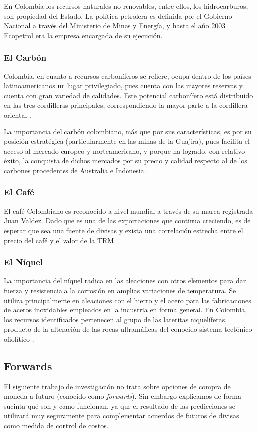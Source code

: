 \documentclass[letterpaper, spanish, 11pt]{report}
\begin{document}
En Colombia los recursos naturales no renovables, entre ellos, los hidrocarburos, son propiedad del Estado. La política petrolera es definida por el Gobierno Nacional a través del Ministerio de Minas y Energía, y hasta el año 2003 Ecopetrol era la empresa encargada de su ejecución.

\subsubsection{El Carbón}
Colombia, en cuanto a recursos carboníferos se refiere, ocupa dentro de los países latinoamericanos un lugar privilegiado, pues cuenta con las mayores reservas y cuenta con gran variedad de calidades. Este potencial carbonífero está distribuido en las tres cordilleras principales, correspondiendo la mayor parte a la cordillera oriental \cite{cardenas}.

La importancia del carbón colombiano, más que por sus características, es por su posición estratégica (particularmente en las minas de la Guajira), pues facilita el acceso al mercado europeo y norteamericano, y porque ha logrado, con relativo éxito, la conquista de dichos mercados por su precio y calidad respecto al de los carbones procedentes de Australia e Indonesia.

\subsubsection{El Café}
El café Colombiano es reconocido a nivel mundial a través de su marca registrada Juan Valdez. Dado que es una de las exportaciones que continua creciendo, es de esperar que sea una fuente de divisas y exista una correlación estrecha entre el precio del café y el valor de la TRM.

\subsubsection{El Níquel}
La importancia del níquel radica en las aleaciones con otros elementos para dar fuerza y resistencia a la corrosión en amplias variaciones de temperatura. Se utiliza principalmente en aleaciones con el hierro y el acero para las fabricaciones de aceros inoxidables empleados en la industria en forma general. En Colombia, los recursos identificados pertenecen al grupo de las lateritas niquelíferas, producto de la alteración de las rocas ultramáficas del conocido sistema tectónico ofiolítico \cite{cardenas}.

\subsection{Forwards}
El siguiente trabajo de investigación no trata sobre opciones de compra de moneda a futuro (conocido como \textit{forwards}). Sin embargo explicamos de forma sucinta qué son y cómo funcionan, ya que el resultado de las predicciones se utilizará muy seguramente para complementar acuerdos de futuros de divisas como medida de control de costos.
\end{document}
